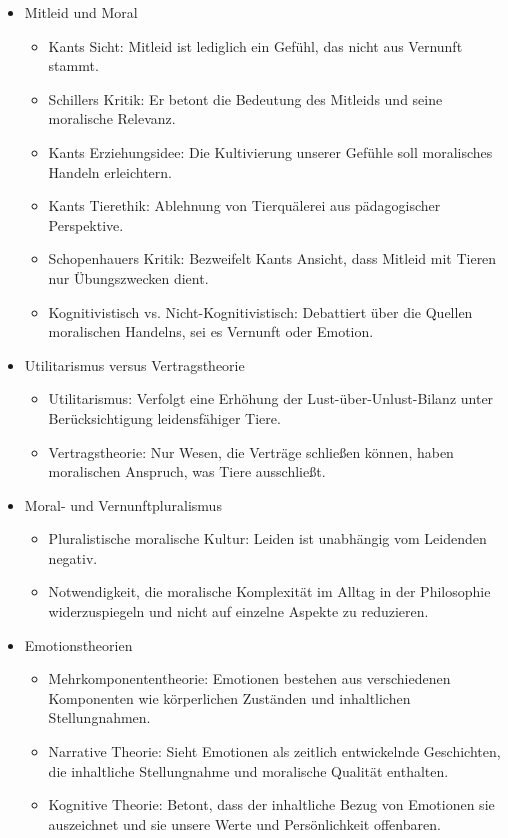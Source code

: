 \documentclass{article}
\begin{document}
\begin{itemize}

	\item Mitleid und Moral
	      \begin{itemize}
		      \item Kants Sicht: Mitleid ist lediglich ein Gefühl, das nicht aus Vernunft stammt.
		      \item Schillers Kritik: Er betont die Bedeutung des Mitleids und seine moralische Relevanz.
		      \item Kants Erziehungsidee: Die Kultivierung unserer Gefühle soll moralisches Handeln erleichtern.
		      \item Kants Tierethik: Ablehnung von Tierquälerei aus pädagogischer Perspektive.
		      \item Schopenhauers Kritik: Bezweifelt Kants Ansicht, dass Mitleid mit Tieren nur Übungszwecken dient.
		      \item Kognitivistisch vs. Nicht-Kognitivistisch: Debattiert über die Quellen moralischen Handelns, sei es Vernunft oder Emotion.
	      \end{itemize}
	\item Utilitarismus versus Vertragstheorie
	      \begin{itemize}
		      \item Utilitarismus: Verfolgt eine Erhöhung der Lust-über-Unlust-Bilanz unter Berücksichtigung leidensfähiger Tiere.
		      \item Vertragstheorie: Nur Wesen, die Verträge schließen können, haben moralischen Anspruch, was Tiere ausschließt.
	      \end{itemize}

	\item Moral- und Vernunftpluralismus
	      \begin{itemize}
		      \item Pluralistische moralische Kultur: Leiden ist unabhängig vom Leidenden negativ.
		      \item Notwendigkeit, die moralische Komplexität im Alltag in der Philosophie widerzuspiegeln und nicht auf einzelne Aspekte zu reduzieren.
	      \end{itemize}

	\item Emotionstheorien
	      \begin{itemize}
		      \item Mehrkomponententheorie: Emotionen bestehen aus verschiedenen Komponenten wie körperlichen Zuständen und inhaltlichen Stellungnahmen.
		      \item Narrative Theorie: Sieht Emotionen als zeitlich entwickelnde Geschichten, die inhaltliche Stellungnahme und moralische Qualität enthalten.
		      \item Kognitive Theorie: Betont, dass der inhaltliche Bezug von Emotionen sie auszeichnet und sie unsere Werte und Persönlichkeit offenbaren.
	      \end{itemize}


\end{itemize}
\end{document}
